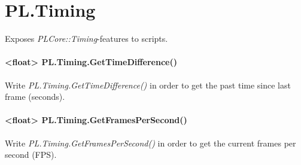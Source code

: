 \section{PL.Timing}
Exposes \emph{PLCore::Timing}-features to scripts.

\paragraph{<float> PL.Timing.GetTimeDifference()}
Write \emph{PL.Timing.GetTimeDifference()} in order to get the past time since last frame (seconds).

\paragraph{<float> PL.Timing.GetFramesPerSecond()}
Write \emph{PL.Timing.GetFramesPerSecond()} in order to get the current frames per second (FPS).
